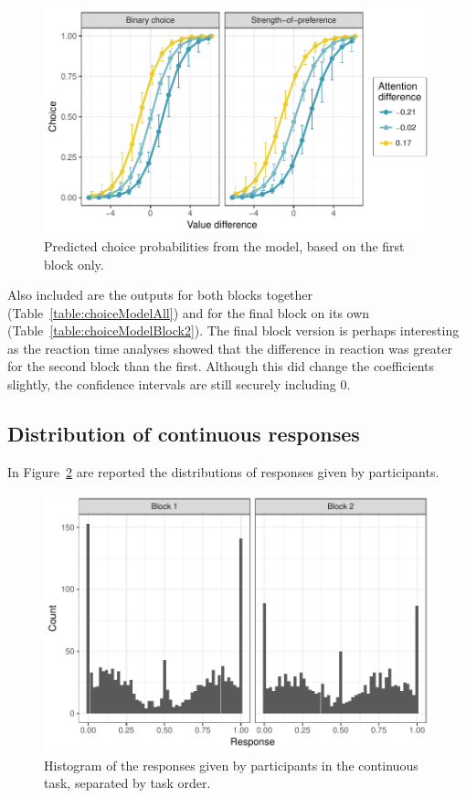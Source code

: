 \documentclass[12pt]{article}
\begin{document}




\begin{figure}
	\includegraphics{images/predictedChoiceGraph}
	\caption{Predicted choice probabilities from the model, based on the first block only.}
	\label{figure:predictedChoiceGraph}	
\end{figure}


Also included are the outputs for both blocks together (Table~\ref{table:choiceModelAll}) and for the final block on its own (Table~\ref{table:choiceModelBlock2}). The final block version is perhaps interesting as the reaction time analyses showed that the difference in reaction was greater for the second block than the first. Although this did change the coefficients slightly, the confidence intervals are still securely including 0. 

\subsection{Distribution of continuous responses}
In Figure~\ref{figure:continuousResponses} are reported the distributions of responses given by participants. 

\begin{figure}[!b]
	\includegraphics{images/continuousResponses}
	\caption{Histogram of the responses given by participants in the continuous task, separated by task order.}
	\label{figure:continuousResponses}
\end{figure}
\end{document}
